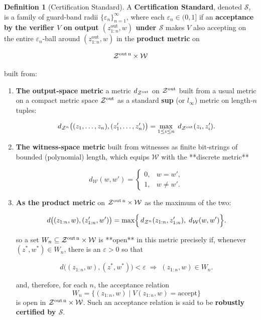 \documentclass{article}
\theoremstyle{definition}
\newtheorem{definition}{Definition}[section]
\theoremstyle{plain}
\begin{document}
\begin{definition}[Certification Standard]
A \textbf{Certification Standard}, denoted $\mathcal{S}$, is a family of guard-band radii $\{\varepsilon_n\}_{n=1}^\infty$, where each $\varepsilon_n \in (0, 1]$ if an \textbf{acceptance by the verifier $V$ on output $(z^{\text{out}}_{1:n}, w)$ under $\mathcal{S}$} makes $V$ also accepting on the entire $\varepsilon_n$-ball around $(z^{\text{out}}_{1:n}, w)$ in the \textbf{product metric} on

$$
\mathcal Z^{\rm out\,n}\times\mathcal W
$$

built from:
\begin{enumerate}
    \item \textbf{The output‐space metric}
   a metric $d_{\mathcal Z^{\rm out}}$ on $\mathcal Z^{\rm out}$ built from a usual metric on a compact metric space $\mathcal Z^{\rm out}$ as a standard \textbf{sup} (or $\textit{l}_{\infty}$) metric on length‑$n$ tuples:

   $$
     d_{\mathcal Z^n}\bigl((z_1,\dots,z_n),(z'_1,\dots,z'_n)\bigr)
     = \max_{1\le i\le n}\;d_{\mathcal Z^{\rm out}}(z_i,z'_i).
   $$

    \item \textbf{The witness‐space metric}
   built from witnesses as finite bit‐strings of bounded (polynomial) length, which equips $\mathcal W$ with the **discrete metric**

   $$
     d_{\mathcal W}(w,w') =
     \begin{cases}
       0, & w = w',\\
       1, & w \neq w'.
     \end{cases}
   $$
    \item \textbf{As the product metric}
    on $\mathcal Z^{\rm out\,n}\times\mathcal W$ as the maximum of the two:

   $$
     d\bigl((z_{1:n},w),(z'_{1:n},w')\bigr)
     = \max\Bigl\{\,d_{\mathcal Z^n}(z_{1:n},z'_{1:n}),\;d_{\mathcal W}(w,w')\Bigr\}.
   $$

so a set $W_n\subseteq\mathcal Z^{\rm out\,n}\times\mathcal W$ is **open** in this metric precisely if, whenever $(z^*,w^*)\in W_n$, there is an $\varepsilon>0$ so that

$$
  d\bigl((z_{1:n},w),(z^*,w^*)\bigr)<\varepsilon
  \;\Longrightarrow\;
  (z_{1:n},w)\in W_n.
$$

and, therefore, for each $n$, the acceptance relation
$$
W_n = \{(z_{1:n},w)\mid V(z_{1:n},w)=\text{accept}\}
$$
is open in $\mathcal Z^{\rm out\,n}\times\mathcal W$. Such an acceptance relation is said to be \textbf{robustly certified by $\mathcal{S}$}.
\end{enumerate}
\end{definition}
\end{document}
